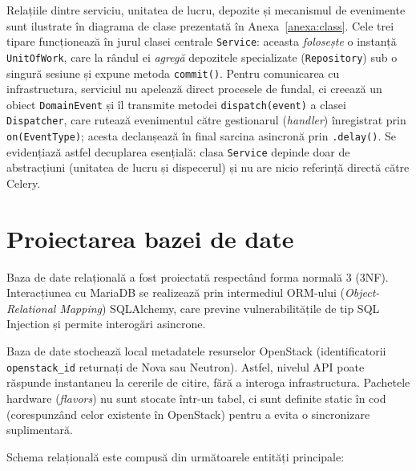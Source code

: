 Relațiile dintre serviciu, unitatea de lucru, depozite și mecanismul de evenimente sunt ilustrate în diagrama de clase prezentată în Anexa~\ref{anexa:class}. Cele trei tipare funcționează în jurul clasei centrale \texttt{Service}: aceasta \textit{folosește} o instanță \texttt{UnitOfWork}, care la rândul ei \textit{agregă} depozitele specializate (\texttt{Repository}) sub o singură sesiune și expune metoda \texttt{commit()}. Pentru comunicarea cu infrastructura, serviciul nu apelează direct procesele de fundal, ci creează un obiect \texttt{DomainEvent} și îl transmite metodei \texttt{dispatch(event)} a clasei \texttt{Dispatcher}, care rutează evenimentul către gestionarul (\textit{handler}) înregistrat prin \texttt{on(EventType)}; acesta declanșează în final sarcina asincronă prin \texttt{.delay()}. Se evidențiază astfel decuplarea esențială: clasa \texttt{Service} depinde doar de abstracțiuni (unitatea de lucru și dispecerul) și nu are nicio referință directă către Celery.

\section{Proiectarea bazei de date}
\label{sec:cap3_baza_date}

Baza de date relațională a fost proiectată respectând forma normală 3 (3NF). Interacțiunea cu MariaDB se realizează prin intermediul ORM-ului (\textit{Object-Relational Mapping}) SQLAlchemy, care previne vulnerabilitățile de tip SQL Injection și permite interogări asincrone.

Baza de date stochează local metadatele resurselor OpenStack (identificatorii \texttt{openstack\_id} returnați de Nova sau Neutron). Astfel, nivelul API poate răspunde instantaneu la cererile de citire, fără a interoga infrastructura. Pachetele hardware (\textit{flavors}) nu sunt stocate într-un tabel, ci sunt definite static în cod (corespunzând celor existente în OpenStack) pentru a evita o sincronizare suplimentară.

Schema relațională este compusă din următoarele entități principale:

